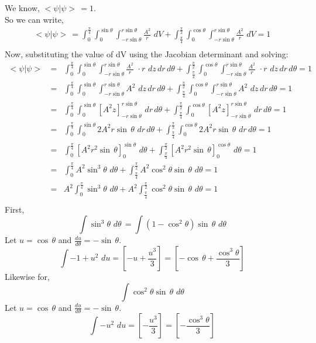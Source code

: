 \documentclass{article}
\begin{document}
\subsection{}%

\large{
We know, $<\psi|\psi>\,=1$. \\
So we can write,
\begin{eqnarray*}
        <\psi|\psi> \,= \int_{0}^{\frac{\pi}{4}}\int_{0}^{\sin\theta}\int_{-r\sin\theta}^{r\sin\theta} \frac{A^2}{r} \,\, dV + \int_{\frac{\pi}{4}}^{\frac{\pi}{2}}\int_{0}^{\cos\theta}\int_{-r\sin\theta}^{r\sin\theta} \frac{A^2}{r} \,\, dV  = 1\\
\end{eqnarray*}
Now, substituting the value of dV using the Jacobian determinant and solving:
\begin{eqnarray*}
        <\psi|\psi> \,&=& \int_{0}^{\frac{\pi}{4}}\int_{0}^{\sin\theta}\int_{-r\sin\theta}^{r\sin\theta} \frac{A^2}{r} \,\, \cdot r\,\,dz\,dr\,d\theta + \int_{\frac{\pi}{4}}^{\frac{\pi}{2}}\int_{0}^{\cos\theta}\int_{-r\sin\theta}^{r\sin\theta} \frac{A^2}{r} \,\, \cdot r\,\,dz\,dr\,d\theta = 1\\
        &=& \int_{0}^{\frac{\pi}{4}} \int_{0}^{\sin\theta} \int_{-r\sin\theta}^{r\sin\theta} A^2 \,\,dz\,dr\,d\theta + \int_{\frac{\pi}{4}}^{\frac{\pi}{2}}\int_{0}^{\cos\theta}\int_{-r\sin\theta}^{r\sin\theta} A^2 \,\,dz\,dr\,d\theta = 1\\
        &=& \int_{0}^{\frac{\pi}{4}} \int_{0}^{\sin\theta} [A^2 z]_{-r\sin\theta}^{r\sin\theta} \,\,dr\,d\theta + \int_{\frac{\pi}{4}}^{\frac{\pi}{2}}\int_{0}^{\cos\theta}  [A^2 z]_{-r\sin\theta}^{r\sin\theta} \,\,dr\,d\theta = 1\\
        &=& \int_{0}^{\frac{\pi}{4}} \int_{0}^{\sin\theta} 2A^2 r\sin\,\theta \,\,dr\,d\theta + \int_{\frac{\pi}{4}}^{\frac{\pi}{2}}\int_{0}^{\cos\theta}  2A^2 r\sin\,\theta  \,\,dr\,d\theta = 1\\
        &=& \int_{0}^{\frac{\pi}{4}} [A^2 r^2\sin\,\theta]_{0}^{\sin\theta}  \,\,d\theta + \int_{\frac{\pi}{4}}^{\frac{\pi}{2}}  [A^2 r^2\sin\,\theta]_{0}^{\cos\theta}  \,\,d\theta = 1\\
        &=& \int_{0}^{\frac{\pi}{4}} A^2 \sin^3 \theta  \,\,d\theta + \int_{\frac{\pi}{4}}^{\frac{\pi}{2}}  A^2 \cos^2\theta \sin\,\theta  \,\,d\theta = 1\\
        &=& A^2  \int_{0}^{\frac{\pi}{4}} \sin^3 \theta  \,\,d\theta + A^2 \int_{\frac{\pi}{4}}^{\frac{\pi}{2}} \cos^2\theta \sin\,\theta  \,\,d\theta = 1\\
\end{eqnarray*}
First,
$$\int \sin^3 \theta  \,\,d\theta\, =\int (1- \cos^2\theta)\sin\,\theta  \,\,d\theta $$
Let $u=\cos\,\theta$ and $\frac{du}{d\theta} = -\sin\,\theta$.
$$\int -1 + u^2  \,\,du = [-u + \frac{u^3}{3}]=[-\cos\,\theta + \frac{\cos^3\theta}{3}]$$
Likewise for,
$$\int \cos^2\theta \sin\,\theta  \,\,d\theta$$
Let $u=\cos\,\theta$ and $\frac{du}{d\theta} = -\sin\,\theta$.
$$\int -u^2  \,\,du = [-\frac{u^3}{3}] = [-\frac{\cos^3\theta}{3}]$$

}
\end{document}
